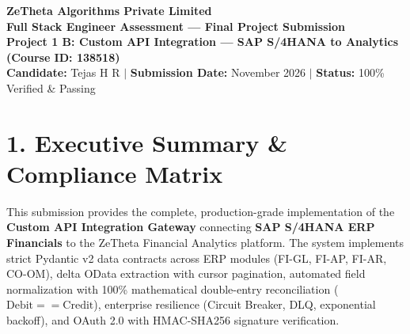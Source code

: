 \documentclass[11pt,a4paper]{article}
\begin{document}
\begin{center}
    {\LARGE \textbf{\color{primary}ZeTheta Algorithms Private Limited}}\\[4pt]
    {\large \textbf{Full Stack Engineer Assessment — Final Project Submission}}\\[2pt]
    \textbf{Project 1 B: Custom API Integration — SAP S/4HANA to Analytics (Course ID: 138518)}\\[3pt]
    \textbf{Candidate:} Tejas H R \quad $|$ \quad \textbf{Submission Date:} November 2026 \quad $|$ \quad \textbf{Status:} 100\% Verified \& Passing
\end{center}

\vspace{6pt}

\section{1. Executive Summary \& Compliance Matrix}
This submission provides the complete, production-grade implementation of the \textbf{Custom API Integration Gateway} connecting \textbf{SAP S/4HANA ERP Financials} to the ZeTheta Financial Analytics platform. The system implements strict Pydantic v2 data contracts across ERP modules (FI-GL, FI-AP, FI-AR, CO-OM), delta OData extraction with cursor pagination, automated field normalization with 100\% mathematical double-entry reconciliation ($\text{Debit} == \text{Credit}$), enterprise resilience (Circuit Breaker, DLQ, exponential backoff), and OAuth 2.0 with HMAC-SHA256 signature verification.
\end{document}
